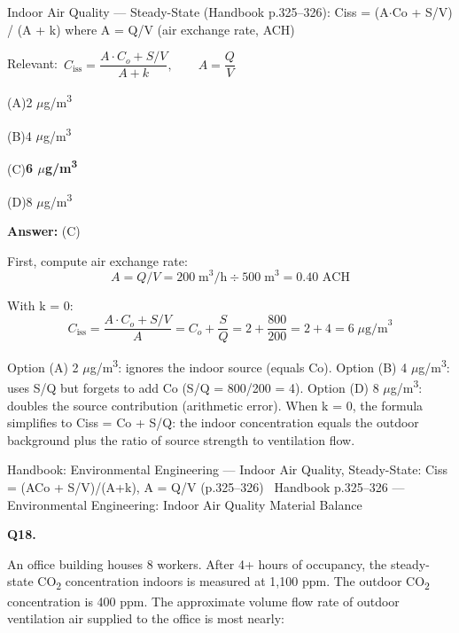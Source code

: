\documentclass[11pt]{article}
\newcommand{\correct}[1]{\textbf{#1}\;{\color{accent}$\checkmark$}}
\newcommand{\optline}[2]{\par\noindent\hspace{1.2em}(#1)\hspace{0.6em}#2}
\begin{document}
Indoor Air Quality --- Steady-State (Handbook p.325--326):
Ciss = (A$\cdot$Co + S/V) / (A + k)
where A = Q/V (air exchange rate, ACH)\par\vspace{3pt}
{\small\color{soft}Relevant:}\ $C_{\text{iss}} = \dfrac{A\cdot C_o + S/V}{A + k},\qquad A = \dfrac{Q}{V}$\par\vspace{3pt}
\optline{A}{2 $\mu$g/m\textsuperscript{3}}
\optline{B}{4 $\mu$g/m\textsuperscript{3}}
\optline{C}{\correct{6 $\mu$g/m\textsuperscript{3}}}
\optline{D}{8 $\mu$g/m\textsuperscript{3}}
\par\vspace{3pt}
\vspace{2pt}\par\noindent\colorbox{boxbg}{\parbox{\dimexpr\linewidth-2\fboxsep\relax}{%
\vspace{2pt}\textbf{Answer:} (C)\par\vspace{2pt}
{\small First, compute air exchange rate:
\[A = Q/V = 200\;\text{m}^3\text{/h}\div500\;\text{m}^3 = 0.40\text{ ACH}\]

With k = 0:
\[C_{\text{iss}} = \frac{A\cdot C_o + S/V}{A} = C_o + \frac{S}{Q} = 2 + \frac{800}{200} = 2 + 4 = 6\;\mu\text{g/m}^3\]

Option (A) 2 $\mu$g/m\textsuperscript{3}: ignores the indoor source (equals Co). Option (B) 4 $\mu$g/m\textsuperscript{3}: uses S/Q but forgets to add Co (S/Q = 800/200 = 4). Option (D) 8 $\mu$g/m\textsuperscript{3}: doubles the source contribution (arithmetic error). When k = 0, the formula simplifies to Ciss = Co + S/Q: the indoor concentration equals the outdoor background plus the ratio of source strength to ventilation flow.}\par\vspace{2pt}
{\footnotesize\color{soft}Handbook: Environmental Engineering --- Indoor Air Quality, Steady-State: Ciss = (ACo + S/V)/(A+k), A = Q/V (p.325--326) \textbullet\ Handbook p.325--326 --- Environmental Engineering: Indoor Air Quality Material Balance}\vspace{2pt}
}}
\vspace{9pt}
\filbreak
\textbf{\color{accent}Q18.}\par\vspace{2pt}
An office building houses 8 workers. After 4+ hours of occupancy, the steady-state CO\textsubscript{2} concentration indoors is measured at 1,100 ppm. The outdoor CO\textsubscript{2} concentration is 400 ppm. The approximate volume flow rate of outdoor ventilation air supplied to the office is most nearly:
\end{document}
